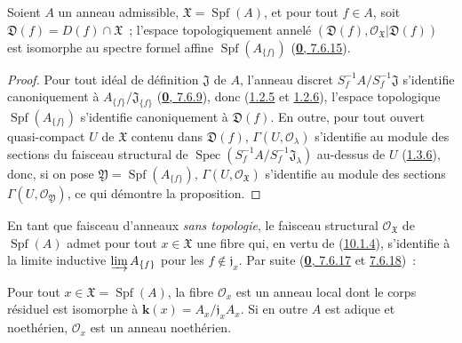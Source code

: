 \begin{proposition}[10.1.4]
\label{I.10.1.4-fr}
Soient $A$ un anneau admissible, $\mathfrak{X}=\operatorname{Spf}(A)$, et
pour tout $f\in A$, soit
$\mathfrak{D}(f)=D(f)\cap\mathfrak{X}$~; l'espace topologiquement annelé
$(\mathfrak{D}(f),\mathscr{O}_{\mathfrak{X}}|\mathfrak{D}(f))$ est
isomorphe au spectre formel affine
$\operatorname{Spf}(A_{\{f\}})$
\textup{(\hyperref[0.7.6.15-fr]{\textbf{0}, 7.6.15})}.
\end{proposition}

\begin{proof}
Pour tout idéal de définition $\mathfrak{J}$ de $A$, l'anneau discret
$S_f^{-1}A/S_f^{-1}\mathfrak{J}$ s'identifie canoniquement à
$A_{\{f\}}/\mathfrak{J}_{\{f\}}$
(\hyperref[0.7.6.9-fr]{\textbf{0}, 7.6.9}), donc
(\hyperref[I.1.2.5-fr]{1.2.5} et \hyperref[I.1.2.6-fr]{1.2.6}), l'espace
topologique $\operatorname{Spf}(A_{\{f\}})$ s'identifie canoniquement à
$\mathfrak{D}(f)$. En outre, pour tout ouvert quasi-compact $U$ de
$\mathfrak{X}$ contenu dans $\mathfrak{D}(f)$,
$\Gamma(U,\mathscr{O}_\lambda)$ s'identifie au module des sections du
faisceau structural de
$\operatorname{Spec}(S_f^{-1}A/S_f^{-1}\mathfrak{J}_\lambda)$ au-dessus de
$U$ (\hyperref[I.1.3.6-fr]{1.3.6}), donc, si on pose
$\mathfrak{Y}=\operatorname{Spf}(A_{\{f\}})$,
$\Gamma(U,\mathscr{O}_{\mathfrak{X}})$ s'identifie au module des sections
$\Gamma(U,\mathscr{O}_{\mathfrak{Y}})$, ce qui démontre la proposition.
\end{proof}

\begin{env}[10.1.5]
\label{I.10.1.5-fr}
En tant que faisceau d'anneaux \emph{sans topologie}, le faisceau
structural $\mathscr{O}_{\mathfrak{X}}$ de
$\operatorname{Spf}(A)$ admet pour tout $x\in\mathfrak{X}$ une fibre qui,
en vertu de (\hyperref[I.10.1.4-fr]{10.1.4}), s'identifie à la limite
inductive
$\varinjlim A_{\{f\}}$ pour les $f\notin\mathfrak{j}_x$. Par suite
(\hyperref[0.7.6.17-fr]{\textbf{0}, 7.6.17} et
\hyperref[0.7.6.18-fr]{7.6.18})~:
\end{env}

\begin{proposition}[10.1.6]
\label{I.10.1.6-fr}
Pour tout $x\in\mathfrak{X}=\operatorname{Spf}(A)$, la fibre
$\mathscr{O}_x$ est un anneau local dont le corps résiduel est isomorphe à
$\boldsymbol{k}(x)=A_x/\mathfrak{j}_xA_x$. Si en outre $A$ est adique et noethérien,
$\mathscr{O}_x$ est un anneau noethérien.
\end{proposition}

